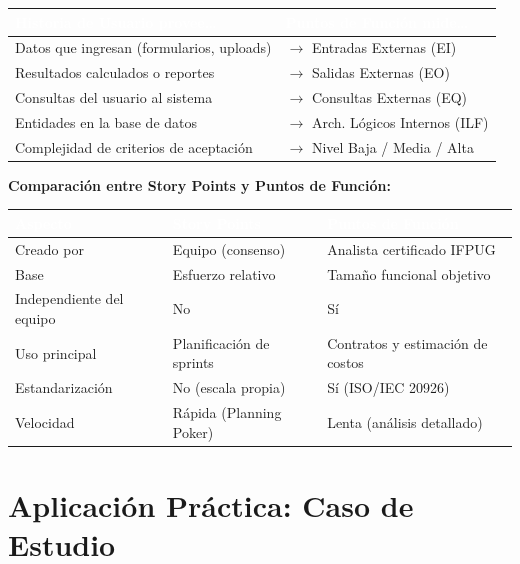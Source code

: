 \documentclass[12pt, a4paper]{article}
\begin{document}
\vspace{0.3cm}
\begin{tabular}{p{6.5cm} p{6.5cm}}
  \toprule
  \rowcolor{espeazul}
  \textcolor{white}{\textbf{Historia de Usuario provee\ldots}} &
  \textcolor{white}{\textbf{Puntos de Función mide\ldots}} \\
  \midrule
  Datos que ingresan (formularios, uploads) & $\rightarrow$ Entradas Externas (EI) \\
  Resultados calculados o reportes          & $\rightarrow$ Salidas Externas (EO) \\
  Consultas del usuario al sistema          & $\rightarrow$ Consultas Externas (EQ) \\
  Entidades en la base de datos             & $\rightarrow$ Arch. Lógicos Internos (ILF) \\
  Complejidad de criterios de aceptación    & $\rightarrow$ Nivel Baja / Media / Alta \\
  \bottomrule
\end{tabular}

\vspace{0.5cm}
\textbf{Comparación entre Story Points y Puntos de Función:}

\vspace{0.3cm}
\begin{tabular}{p{4cm} p{4.5cm} p{4.5cm}}
  \toprule
  \rowcolor{espeazul}
  \textcolor{white}{\textbf{Aspecto}} &
  \textcolor{white}{\textbf{Story Points}} &
  \textcolor{white}{\textbf{Puntos de Función}} \\
  \midrule
  Creado por        & Equipo (consenso)          & Analista certificado IFPUG \\
  Base              & Esfuerzo relativo          & Tamaño funcional objetivo \\
  Independiente del equipo & No               & Sí \\
  Uso principal     & Planificación de sprints   & Contratos y estimación de costos \\
  Estandarización   & No (escala propia)         & Sí (ISO/IEC 20926) \\
  Velocidad         & Rápida (Planning Poker)    & Lenta (análisis detallado) \\
  \bottomrule
\end{tabular}

\section{Aplicación Práctica: Caso de Estudio}
\end{document}
